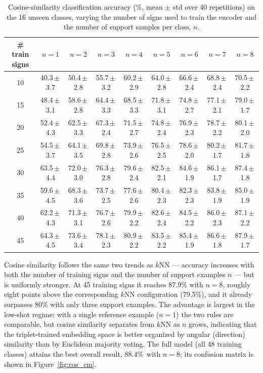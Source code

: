 \documentclass{article}
\begin{document}
\begin{table}[h!]
\centering
\scriptsize
\begin{tabular}{ccccccccc}
\toprule
\# train signs & $n=1$ & $n=2$ & $n=3$ & $n=4$ & $n=5$ & $n=6$ & $n=7$ & $n=8$ \\
\midrule
10 & 40.3\,$\pm$\,3.7 & 50.4\,$\pm$\,2.8 & 55.7\,$\pm$\,3.2 & 60.2\,$\pm$\,2.9 & 64.0\,$\pm$\,2.8 & 66.6\,$\pm$\,2.4 & 68.8\,$\pm$\,2.4 & 70.5\,$\pm$\,2.2 \\
15 & 48.4\,$\pm$\,3.1 & 58.6\,$\pm$\,2.8 & 64.4\,$\pm$\,3.3 & 68.5\,$\pm$\,3.3 & 71.8\,$\pm$\,3.1 & 74.8\,$\pm$\,2.7 & 77.1\,$\pm$\,2.1 & 79.0\,$\pm$\,1.7 \\
20 & 52.4\,$\pm$\,4.3 & 62.5\,$\pm$\,3.3 & 67.3\,$\pm$\,2.4 & 71.5\,$\pm$\,2.7 & 74.8\,$\pm$\,2.4 & 76.9\,$\pm$\,2.3 & 78.7\,$\pm$\,2.2 & 80.1\,$\pm$\,2.0 \\
25 & 54.5\,$\pm$\,3.7 & 64.1\,$\pm$\,3.5 & 69.8\,$\pm$\,2.8 & 73.9\,$\pm$\,2.6 & 76.5\,$\pm$\,2.5 & 78.6\,$\pm$\,2.0 & 80.2\,$\pm$\,1.7 & 81.7\,$\pm$\,1.8 \\
30 & 63.5\,$\pm$\,4.4 & 72.0\,$\pm$\,3.0 & 76.3\,$\pm$\,2.8 & 79.6\,$\pm$\,2.4 & 82.5\,$\pm$\,2.1 & 84.6\,$\pm$\,1.9 & 86.1\,$\pm$\,1.7 & 87.4\,$\pm$\,1.8 \\
35 & 59.6\,$\pm$\,4.5 & 68.3\,$\pm$\,3.6 & 73.7\,$\pm$\,2.5 & 77.6\,$\pm$\,2.6 & 80.4\,$\pm$\,2.3 & 82.3\,$\pm$\,2.3 & 83.8\,$\pm$\,1.9 & 85.0\,$\pm$\,1.9 \\
40 & 62.2\,$\pm$\,4.3 & 71.3\,$\pm$\,3.1 & 76.7\,$\pm$\,2.6 & 79.9\,$\pm$\,2.2 & 82.6\,$\pm$\,2.4 & 84.5\,$\pm$\,2.2 & 86.0\,$\pm$\,2.3 & 87.1\,$\pm$\,2.2 \\
45 & 64.3\,$\pm$\,4.5 & 73.6\,$\pm$\,3.4 & 78.1\,$\pm$\,2.3 & 80.9\,$\pm$\,2.2 & 83.5\,$\pm$\,2.2 & 85.4\,$\pm$\,1.9 & 86.6\,$\pm$\,1.8 & 87.9\,$\pm$\,1.7 \\
\bottomrule
\end{tabular}
\caption{Cosine-similarity classification accuracy (\%, mean $\pm$ std over 40 repetitions) on the 16 unseen classes, varying the number of signs used to train the encoder and the number of support samples per class, $n$.}
\label{table:cos}
\end{table}

Cosine similarity follows the same two trends as $k$NN --- accuracy increases with both the number of training signs and the number of support examples $n$ --- but is uniformly stronger. At 45 training signs it reaches 87.9\% with $n=8$, roughly eight points above the corresponding $k$NN configuration (79.5\%), and it already surpasses 80\% with only three support examples. The advantage is largest in the low-shot regime: with a single reference example ($n=1$) the two rules are comparable, but cosine similarity separates from $k$NN as $n$ grows, indicating that the triplet-trained embedding space is better organized by angular (direction) similarity than by Euclidean majority voting. The full model (all 48 training classes) attains the best overall result, 88.4\%\ with $n=8$; its confusion matrix is shown in Figure~\ref{fig:cos_cm}.
\end{document}
